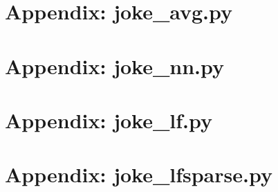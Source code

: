 \documentclass{article}
\begin{document}
\section*{Appendix: joke\_avg.py}


\section*{Appendix: joke\_nn.py}


\section*{Appendix: joke\_lf.py}


\section*{Appendix: joke\_lfsparse.py}

\end{document}
